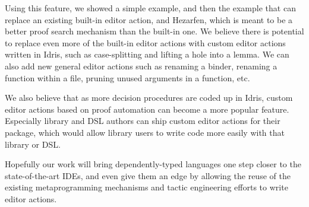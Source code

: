 Using this feature, we showed a simple  example, and then the
 example that can replace an existing built-in editor action,
and Hezarfen, which is meant to be a better proof search mechanism than the
built-in one. We believe there is potential to replace even more of the
built-in editor actions with custom editor actions written in Idris, such as
case-splitting and lifting a hole into a lemma. We can also add new general
editor actions such as renaming a binder, renaming a function within a file,
pruning unused arguments in a function, etc.

We also believe that as more decision procedures are coded up in Idris,
custom editor actions based on proof automation can become a more popular
feature. Especially library and DSL authors can ship custom editor actions for
their package, which would allow library users to write code more easily with
that library or DSL.

Hopefully our work will bring dependently-typed languages one step closer to the
state-of-the-art IDEs, and even give them an edge by allowing the reuse of the
existing metaprogramming mechanisms and tactic engineering efforts to write
editor actions.

